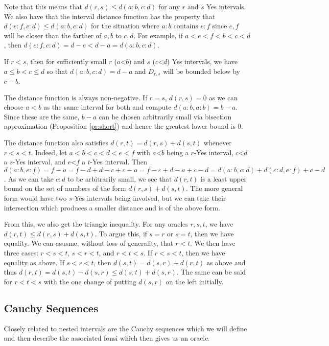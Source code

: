 \documentclass[12pt]{article}
\theoremstyle{remark}
\newcommand{\lt}{\mathord{<}}
\begin{document}
Note that this means that $d(r,s) \leq d(a:b, c:d)$ for any $r$ and $s$ Yes intervals. We also have that the interval distance function has the property that $d(e:f, c:d) \leq d(a:b, c:d)$ for the situation where $a:b$ contains $e:f$ since $e, f$ will be closer than the farther of $a,b$ to $c,d$. For example, if $a < e < f < b < c< d$, then $d(e:f, c:d) = d-e < d-a = d(a:b, c:d)$. 

If $r<s$, then for sufficiently small $r$ ($a\lt b)$ and $s$ ($c\lt d$) Yes intervals, we have $a\leq b<c \leq d$ so that $d(a:b,c:d) = d-a$ and $D_{r,s}$ will be bounded below by $c-b$.

The distance function is always non-negative. If $r=s$, $d(r,s)=0$ as we can choose $a<b$ as the same interval for both and compute $d(a:b,a:b)= b-a$. Since these are the same, $b-a$ can be chosen arbitrarily small via bisection approximation (Proposition \ref{pr:short}) and hence the greatest lower bound is 0. 

The distance function also satisfies $d(r,t) = d(r,s) + d(s,t)$ whenever $r < s < t$. Indeed, let $a<b<c<d<e<f$ with $a\lt b$ being a $r$-Yes interval, $c\lt d$ a $s$-Yes interval, and $e\lt f$ a $t$-Yes interval. Then $d(a:b, e:f) = f-a = f-d+d-c+c-a = f-c + d -a + c -d =d(a:b,c:d) +d(c:d,e:f) + c-d$. As we can take $c:d$ to be arbitrarily small, we see that $d(r,t)$ is a least upper bound on the set of numbers of the form $d(r,s) + d(s,t)$.  The more general form would have two $s$-Yes intervals being involved, but we can take their intersection which produces a smaller distance and is of the above form. 

From this, we also get the triangle inequality. For any oracles $r, s, t$, we have $d(r,t) \leq d(r,s) + d(s,t)$.  To argue this, if $s = r$ or $s=t$, then we have equality. We can asusme, without loss of generality, that $r < t$. We then have three cases: $r< s< t$, $s < r < t$, and $r< t  < s$. If $r < s< t$, then we have equality as above. If $s < r < t$, then $d(s,t) = d(s,r) + d(r,t)$ as above and thus $d(r,t) = d(s,t) - d(s,r) \leq d(s,t) + d(s,r)$. The same can be said for $r < t < s$ with the one change of putting $d(s,r)$ on the left initially. 

\subsection{Cauchy Sequences}

Closely related to nested intervals are the Cauchy sequences which we will define and then describe the associated fonsi which then gives us an oracle. 
\end{document}

